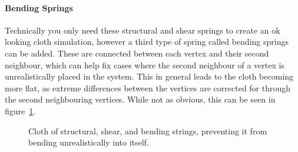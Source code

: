 \paragraph{Bending Springs}
Technically you only need these structural and shear springs to create an ok looking cloth simulation,
however a third type of spring called bending springs can be added.
These are connected between each vertex and their second neighbour,
which can help fix cases where the second neighbour of a vertex is unrealistically placed in the system.
This in general leads to the cloth becoming more flat, as extreme differences between the vertices are corrected for
through the second neighbouring vertices\cite{jeff_lander_real_time_cloth}.
While not as obvious, this can be seen in figure~\ref{fig:bending_springs_collapsing}.
\begin{figure}[H]
    \centering
    \caption{Cloth of structural, shear, and bending strings, preventing it from bending unrealistically into itself.}
    \label{fig:bending_springs_collapsing}
\end{figure}

%

